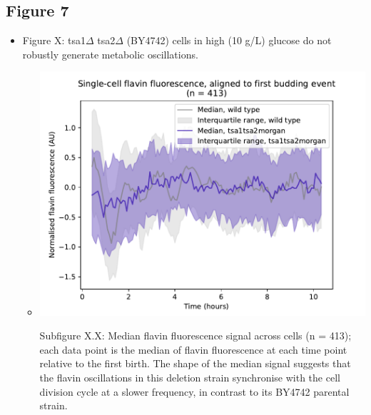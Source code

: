 \subsection{Figure 7}
\begin{itemize}
\item Figure X: tsa1\(\Delta\) tsa2\(\Delta\) (BY4742) cells in high (10 g/L) glucose do not robustly generate metabolic oscillations.

\begin{itemize}
\item \begin{center}
\includegraphics[width=.9\linewidth]{tsa1tsa2morgan_1253_plots_6.pdf}
\end{center} Subfigure X.X: Median flavin fluorescence signal across cells (n = 413); each data point is the median of flavin fluorescence at each time point relative to the first birth.  The shape of the median signal suggests that the flavin oscillations in this deletion strain synchronise with the cell division cycle at a slower frequency, in contrast to its BY4742 parental strain.
\end{itemize}


\end{itemize}
